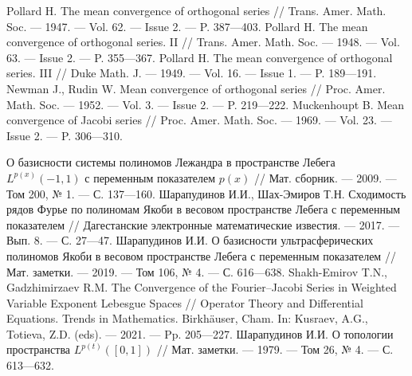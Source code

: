 \begin{thebibliography}{111}

  
 Pollard H. The mean convergence of orthogonal series // Trans. Amer. Math. Soc.
--- 1947. --- Vol. 62. --- Issue 2. --- P. 387---403.
 Pollard H. The mean convergence of orthogonal series. II // Trans. Amer. Math. Soc.
--- 1948. --- Vol. 63. --- Issue 2. --- P. 355---367.
 Pollard H. The mean convergence of orthogonal series. III // Duke Math. J. --- 1949.
--- Vol. 16. --- Issue 1. --- P. 189---191.
 Newman J., Rudin W. Mean convergence of orthogonal series // Proc. Amer. Math.
Soc. --- 1952. --- Vol. 3. --- Issue 2. --- P. 219---222.
Muckenhoupt B. Mean convergence of Jacobi series // Proc. Amer. Math. Soc. --- 1969.
--- Vol. 23. --- Issue 2. --- P. 306---310.

 О базисности системы полиномов Лежандра в пространстве Лебега $L^{p(x)}(-1,1)$ с переменным показателем $p(x)$ // Мат. сборник. --- 2009. --- Том 200, № 1. --- С. 137---160.
Шарапудинов И.И., Шах-Эмиров Т.Н. Сходимость рядов Фурье по полиномам Якоби в весовом пространстве Лебега с переменным показателем // Дагестанские электронные математические известия. --- 2017. --- Вып. 8. --- С. 27---47.
Шарапудинов И.И. О базисности ультрасферических полиномов Якоби в весовом пространстве Лебега с переменным показателем // Мат. заметки. --- 2019. --- Том 106, № 4. --- С. 616---638.
 Shakh-Emirov T.N., Gadzhimirzaev R.M.  The Convergence of the Fourier–Jacobi Series in Weighted Variable Exponent Lebesgue Spaces // Operator Theory and Differential Equations. Trends in Mathematics. Birkhäuser, Cham.  In: Kusraev, A.G., Totieva, Z.D. (eds). --- 2021. --- Pp. 205---227.
 Шарапудинов И.И. О топологии пространства $L^{p(t)}([0,1])$ // Мат. заметки. --- 1979. --- Том 26, № 4. --- С. 613---632.




\end{thebibliography}
